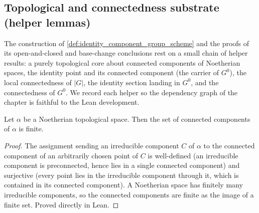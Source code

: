 
\subsection{Topological and connectedness substrate (helper lemmas)}
\label{subsec:identity_component_substrate}

The construction of \cref{def:identity_component_group_scheme} and the
proofs of its open-and-closed and base-change conclusions rest on a small
chain of helper results: a purely topological core about connected
components of Noetherian spaces, the identity point and its connected
component (the carrier of \(G^0\)), the local connectedness of \(|G|\), the
identity section landing in \(G^0\), and the connectedness of \(G^0\). We
record each helper so the dependency graph of the chapter is faithful to
the Lean development.

\begin{lemma}
  \label{lem:noetherian_finite_connected_components}
  Let \(\alpha\) be a Noetherian topological space. Then the set of
  connected components of \(\alpha\) is finite.
\end{lemma}
\begin{proof}
  The assignment sending an irreducible component \(C\) of \(\alpha\) to the
  connected component of an arbitrarily chosen point of \(C\) is
  well-defined (an irreducible component is preconnected, hence lies in a
  single connected component) and surjective (every point lies in the
  irreducible component through it, which is contained in its connected
  component). A Noetherian space has finitely many irreducible components,
  so the connected components are finite as the image of a finite set.
  Proved directly in Lean.
\end{proof}

